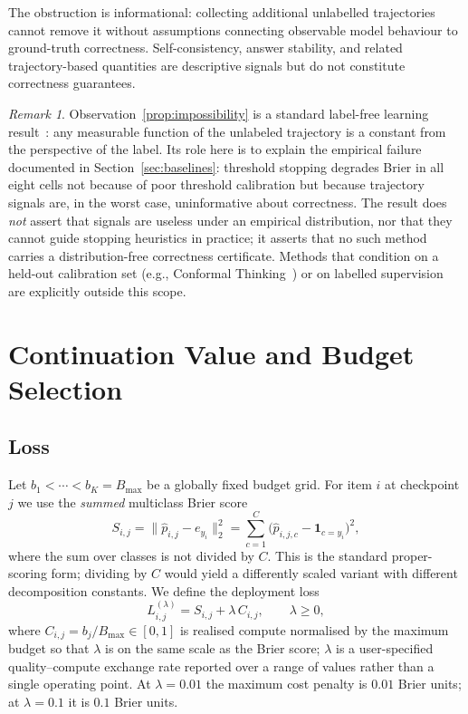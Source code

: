 \documentclass[a4paper,fleqn]{cas-sc}
\newcommand{\budget}{b}
\newcommand{\Bmax}{B_{\max}}
\newcommand{\Brier}{S}
\newcommand{\cost}{C}
\newcommand{\lossfn}{L}
\theoremstyle{plain}
\theoremstyle{definition}
\theoremstyle{remark}
\newtheorem*{remark}{Remark}
\begin{document}
The obstruction is informational: collecting additional unlabelled trajectories
cannot remove it without assumptions connecting observable model behaviour to
ground-truth correctness. Self-consistency, answer stability, and related
trajectory-based quantities are descriptive signals but do not constitute
correctness guarantees.

\begin{remark}
Observation~\ref{prop:impossibility} is a standard label-free learning
result~\cite{shalev2014understanding}: any measurable function of the unlabeled
trajectory is a constant from the perspective of the label.
Its role here is to explain the empirical failure documented in
Section~\ref{sec:baselines}: threshold stopping degrades Brier in all eight
cells not because of poor threshold calibration but because trajectory signals
are, in the worst case, uninformative about correctness.
The result does \emph{not} assert that signals are useless under an empirical
distribution, nor that they cannot guide stopping heuristics in practice;
it asserts that no such method carries a distribution-free correctness
certificate. Methods that condition on a held-out calibration set (e.g.,
Conformal Thinking~\cite{wang2026conformalthinking}) or on labelled
supervision are explicitly outside this scope.
\end{remark}

\section{Continuation Value and Budget Selection}
\label{sec:formulation}

\subsection{Loss}

Let $\budget_1 < \cdots < \budget_K = \Bmax$ be a globally fixed budget grid.
For item $i$ at checkpoint $j$ we use the \emph{summed} multiclass Brier score
~\cite{brier1950verification,gneiting2007strictly}
\begin{equation}
  \Brier_{i,j}
  = \bigl\lVert\hat{p}_{i,j} - e_{y_i}\bigr\rVert_2^2
  = \sum_{c=1}^{C}\bigl(\hat{p}_{i,j,c} - \mathbf{1}_{c=y_i}\bigr)^2,
\end{equation}
where the sum over classes is not divided by $C$.  This is the standard
proper-scoring form; dividing by $C$ would yield a differently scaled variant
with different decomposition constants.
We define the deployment loss
\begin{equation}
  \lossfn^{(\lambda)}_{i,j} = \Brier_{i,j} + \lambda\,\cost_{i,j},
  \qquad \lambda\geq 0,
\end{equation}
where $\cost_{i,j} = b_j / \Bmax \in [0,1]$ is realised compute normalised
by the maximum budget so that $\lambda$ is on the same scale as the Brier
score; $\lambda$ is a user-specified quality--compute exchange rate reported
over a range of values rather than a single operating point.
At $\lambda{=}0.01$ the maximum cost penalty is $0.01$ Brier units;
at $\lambda{=}0.1$ it is $0.1$ Brier units.
\end{document}

